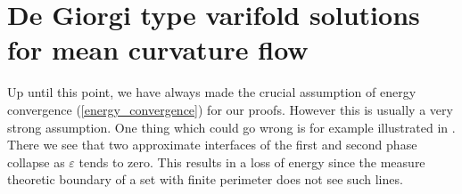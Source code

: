 \section{De Giorgi type varifold solutions for mean curvature flow}
\label{subsection_de_giorgi_type_varifold_solutions_for_mcf}

Up until this point, we have always made the crucial assumption of energy 
convergence (\ref{energy_convergence}) for our proofs.
However this is usually a very strong assumption. One thing which could go 
wrong is for example illustrated in 
. There we see that two approximate interfaces 
of 
the first and second phase collapse as $ \varepsilon $ tends to zero. This 
results in a loss of energy since the measure theoretic boundary of a set with
finite perimeter does not see such lines.

